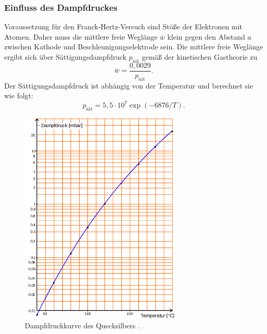 \subsubsection{Einfluss des Dampfdruckes}
Voraussetzung für den Franck-Hertz-Versuch sind Stöße der Elektronen mit Atomen.
Daher muss die mittlere freie Weglänge $\bar{w}$ klein gegen den Abstand $a$ zwischen Kathode
und Beschleunigungselektrode sein.
Die mittlere freie Weglänge ergibt sich über Sättigungsdampfdruck $p_{\mathrm{sät}}$ gemäß der kinetischen
Gastheorie zu
\begin{equation}
	\label{eqn:freiewegl}
	\bar{w} = \frac{0,0029}{p_{\mathrm{sät}}} \mathrm{.}
\end{equation}
Der Sättigungsdampfdruck ist abhängig von der Temperatur und berechnet sie wie folgt:
\begin{equation}
	\label{eqn:p}
	p_\mathrm{sät}=5,5\cdot10^{7}\exp(-6876/T) \mathrm{.}
\end{equation}
\begin{figure}
  \centering
  \includegraphics[width=0.7\textwidth]{Bilder/dampfdruckkurve.png}
  \caption{Dampfdruckkurve des Quecksilbers \cite{Anleitung}.}
  \label{fig:dampfi}
\end{figure}
